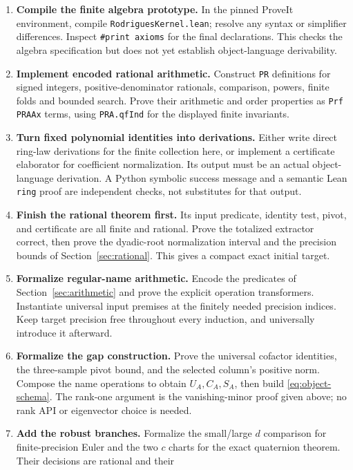 \begin{enumerate}
\item \textbf{Compile the finite algebra prototype.} In the pinned
ProveIt environment, compile \texttt{RodriguesKernel.lean}; resolve any
syntax or simplifier differences. Inspect \texttt{\#print axioms} for
the final declarations. This checks the algebra specification but does
not yet establish object-language derivability.
\item \textbf{Implement encoded rational arithmetic.} Construct
\texttt{PR} definitions for signed integers, positive-denominator
rationals, comparison, powers, finite folds and bounded search. Prove
their arithmetic and order properties as \texttt{Prf PRAAx} terms,
using \texttt{PRA.qfInd} for the displayed finite invariants.
\item \textbf{Turn fixed polynomial identities into derivations.}
Either write direct ring-law derivations for the finite collection here,
or implement a certificate elaborator for coefficient normalization.
Its output must be an actual object-language derivation. A Python
symbolic success message and a semantic Lean \texttt{ring} proof are
independent checks, not substitutes for that output.
\item \textbf{Finish the rational theorem first.} Its input predicate,
identity test, pivot, and certificate are all finite and rational.
Prove the totalized extractor correct, then prove the dyadic-root
normalization interval and the precision bounds of
Section~\ref{sec:rational}. This gives a compact exact initial target.
\item \textbf{Formalize regular-name arithmetic.} Encode the predicates
of Section~\ref{sec:arithmetic} and prove the explicit operation
transformers. Instantiate universal input premises at the finitely
needed precision indices. Keep target precision free throughout every
induction, and universally introduce it afterward.
\item \textbf{Formalize the gap construction.} Prove the universal
cofactor identities, the three-sample pivot bound, and the selected
column's positive norm. Compose the name operations to obtain
$U_A,C_A,S_A$, then build \eqref{eq:object-schema}. The rank-one
argument is the vanishing-minor proof given above; no rank API or
eigenvector choice is needed.
\item \textbf{Add the robust branches.} Formalize the small/large
$d$ comparison for finite-precision Euler and the two $c$ charts for
the exact quaternion theorem. Their decisions are rational and their

\end{enumerate}

